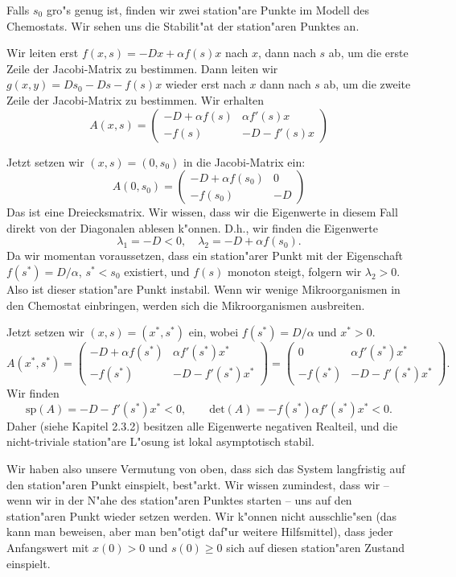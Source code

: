 \begin{bspX} 
Falls $s_0$ gro"s genug ist, finden wir 
zwei station"are Punkte im Modell des Chemostats. Wir sehen uns die Stabilit"at der station"aren Punktes an. 

 Wir leiten erst $f(x,s) = -Dx+\alpha f(s) x$ 
nach $x$, dann nach $s$ ab, um die erste Zeile der Jacobi-Matrix zu bestimmen. 
Dann leiten wir $g(x,y) = Ds_0-Ds-f(s)x$ wieder erst nach $x$ dann nach $s$ ab, 
um die zweite Zeile der Jacobi-Matrix zu bestimmen. Wir erhalten
$$ A(x,s) = \left(\begin{array}{cc}
-D+\alpha f(s) & \alpha f'(s)x\\
-f(s) & -D-f'(s)x
\end{array}\right)$$

 Jetzt setzen wir  
$(x,s)=(0,s_0)$ in die Jacobi-Matrix ein: 
$$A(0,s_0) = 
\left(\begin{array}{cc}
-D+\alpha f(s_0) & 0\\
-f(s_0) & -D
\end{array}\right)
$$
Das ist eine Dreiecksmatrix. Wir wissen, dass wir die Eigenwerte in diesem Fall 
direkt von der Diagonalen ablesen k"onnen. D.h., wir finden die Eigenwerte
$$ \lambda_1 = -D<0,\quad \lambda_2 = -D+\alpha f(s_0).$$
Da wir momentan voraussetzen, dass ein station"arer Punkt mit der Eigenschaft
$f(s^*)=D/\alpha$, $s^*<s_0$ existiert, und $f(s)$ monoton steigt, 
folgern wir $\lambda_2>0$. Also ist dieser station"are Punkt instabil. 
Wenn wir wenige Mikroorganismen in den Chemostat einbringen, 
werden sich die Mikroorganismen ausbreiten. 

Jetzt setzen wir $(x,s)=(x^*,s^*)$ ein, wobei $f(s^*)=D/\alpha$ und $x^*
>0$.
$$ A(x^*,s^*) = \left(\begin{array}{cc}
-D+\alpha f(s^*) & \alpha f'(s^*)x^*\\
-f(s^*) & -D-f'(s^*)x^*
\end{array}\right)
=
\left(\begin{array}{cc}
0 & \alpha f'(s^*)x^*\\
-f(s^*) & -D-f'(s^*)x^*
\end{array}\right).
$$
Wir finden
$$ \mbox{sp}(A)=-D-f'(s^*)x^*<0,\qquad
\mbox{det}(A) = -f(s^*) \alpha f'(s^*)x^*<0.$$
Daher (siehe Kapitel 2.3.2) besitzen alle Eigenwerte negativen Realteil, und
 die nicht-triviale station"are L"osung ist lokal asymptotisch stabil.
\end{bspX}
Wir haben also unsere Vermutung von oben, dass sich das System langfristig auf 
den station"aren Punkt einspielt, best"arkt. Wir wissen zumindest, dass wir -- 
wenn wir in der N"ahe des station"aren Punktes starten -- uns auf den station"aren 
Punkt wieder setzen werden. Wir k"onnen nicht ausschlie"sen (das kann man beweisen, 
aber man ben"otigt daf"ur weitere Hilfsmittel), 
dass jeder Anfangswert mit $x(0)>0$ 
und $s(0)\geq 0$ sich auf diesen station"aren Zustand einspielt. 
